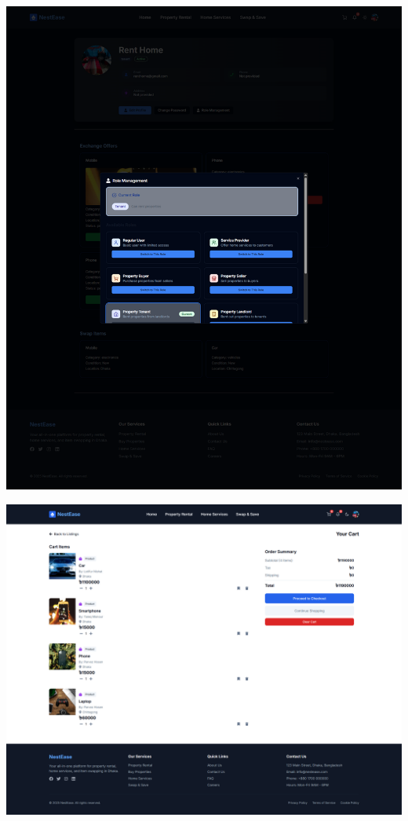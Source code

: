 \documentclass[conference]{IEEEtran}
\begin{document}
\begin{center}
\noindent
\begin{minipage}[t]{0.45\textwidth}
\includegraphics[width=\linewidth]{Project Screenshot/Role Switch.png}
\end{minipage} \hfill
\begin{minipage}[t]{0.45\textwidth}
\includegraphics[width=\linewidth]{Project Screenshot/Dark White Mode.png}
\end{minipage}


\end{center}
\end{document}
